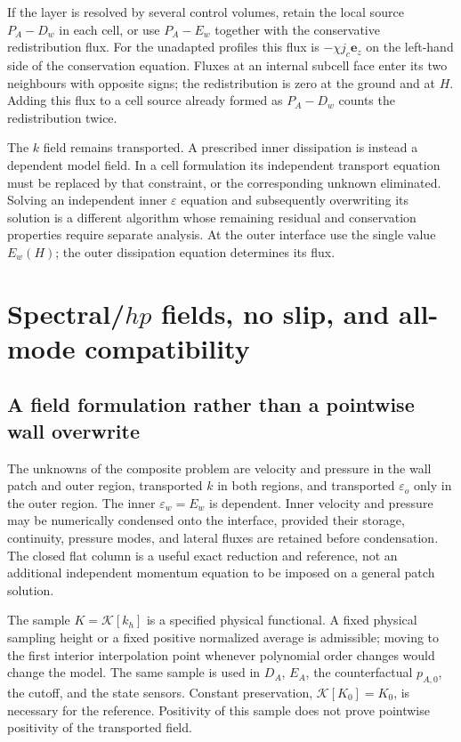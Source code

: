 \documentclass[11pt,a4paper]{article}
\numberwithin{equation}{section}
\newcommand{\eps}{\varepsilon}
\begin{document}
If the layer is resolved by several control volumes, retain the local
source $P_A-D_w$ in each cell, or use $P_A-E_w$ together with the
conservative redistribution flux.  For the unadapted profiles this
flux is $-\chi j_c\boldsymbol e_z$ on the left-hand side of the
conservation equation.  Fluxes at an internal subcell face enter
its two neighbours with opposite signs; the redistribution is zero
at the ground and at $H$.  Adding this flux to a cell source already
formed as $P_A-D_w$ counts the redistribution twice.

The $k$ field remains transported.  A prescribed inner dissipation
is instead a dependent model field.  In a cell formulation its
independent transport equation must be replaced by that constraint,
or the corresponding unknown eliminated.  Solving an independent
inner $\eps$ equation and subsequently overwriting its solution is
a different algorithm whose remaining residual and conservation
properties require separate analysis.  At the outer interface use
the single value $E_w(H)$; the outer dissipation equation determines
its flux.

\section{Spectral/\texorpdfstring{$hp$}{hp} fields, no slip, and all-mode compatibility}
\label{geo:hp}

\subsection{A field formulation rather than a pointwise wall overwrite}

The unknowns of the composite problem are velocity and pressure in
the wall patch and outer region, transported $k$ in both regions,
and transported $\eps_o$ only in the outer region.  The inner
$\eps_w=E_w$ is dependent.  Inner velocity and pressure may be
numerically condensed onto the interface, provided their storage,
continuity, pressure modes, and lateral fluxes are retained before
condensation.  The closed flat column is a useful exact reduction
and reference, not an additional independent momentum equation to
be imposed on a general patch solution.
\label{geo:fields}

The sample $K=\mathcal K[k_h]$ is a specified physical functional.
A fixed physical sampling height or a fixed positive normalized
average is admissible; moving to the first interior interpolation
point whenever polynomial order changes would change the model.
The same sample is used in $D_A$, $E_A$, the counterfactual $p_{A,0}$,
the cutoff, and the state sensors.  Constant preservation,
$\mathcal K[K_0]=K_0$, is necessary for the reference.  Positivity of
this sample does not prove pointwise positivity of the transported
field.
\end{document}
